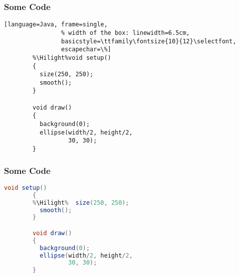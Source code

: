 \documentclass[14pt]{beamer}
\newcommand{\Hilight}{\makebox[0pt][l]{\color{light-gray}\rule[-4pt]{1.0\linewidth}{12pt}}}
\begin{document}



\begin{frame}[fragile]
	\frametitle{Some Code}

	\begin{lstlisting}[language=Java, frame=single,
				% width of the box: linewidth=6.5cm,
				basicstyle=\ttfamily\fontsize{10}{12}\selectfont,
				escapechar=\%]
		%\Hilight%void setup()
		{
		  size(250, 250);
		  smooth();
		}

		void draw()
		{
		  background(0);
		  ellipse(width/2, height/2,
		          30, 30);
		}
	\end{lstlisting}
\end{frame}


\begin{frame}[fragile]
	\frametitle{Some Code}

	\begin{lstlisting}[language=Java, frame=single,
				basicstyle=\ttfamily\fontsize{10}{12}\selectfont,
				escapechar=\%]
		void setup()
		{
		%\Hilight%  size(250, 250);
		  smooth();
		}

		void draw()
		{
		  background(0);
		  ellipse(width/2, height/2,
		          30, 30);
		}
	\end{lstlisting}
\end{frame}



\begin{frame}[fragile]
	\frametitle{\MP}
	\begin{figure}[ht]
	\end{figure}
\end{frame}


\end{document}
